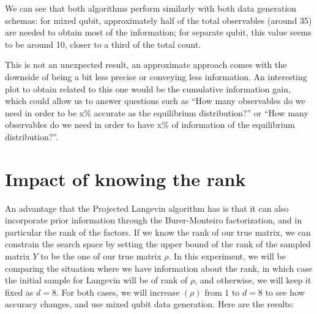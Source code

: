 \documentclass[12pt]{memoir}
\newcommand{\rhorank}[0]{\text{rank}$(\rho) $ }
\begin{document}
We can see that both algorithms perform similarly with both data generation schemas: for mixed qubit, approximately half of the total observables (around 35) are needed to obtain most of the information; for separate qubit, this value seems to be around 10, closer to a third of the total count.\medbreak


This is not an unexpected result, an approximate approach comes with the downside of being a bit less precise or conveying less information. An interesting plot to obtain related to this one would be the cumulative information gain, which could allow us to answer questions such as ``How many observables do we need in order to be x\% accurate as the equilibrium distribution?'' or ``How many observables do we need in order to have x\% of information of the equilibrium distribution?''.


\section{Impact of knowing the rank}\label{section:comp-rank-info}

An advantage that the Projected Langevin algorithm has is that it can also incorporate prior information through the Burer-Monteiro factorization, and in particular the rank of the factors. If we know the rank of our true matrix, we can constrain the search space by setting the upper bound of the rank of the sampled matrix $Y$ to be the one of our true matrix $\rho$. In this experiment, we will be comparing the situation where we have information about the rank, in which case the initial sample for Langevin will be of rank of $\rho$, and otherwise, we will keep it fixed as $d=8$. For both cases, we will increase \rhorank from $1$ to $d=8$ to see how accuracy changes, and use mixed qubit data generation. Here are the results:
\end{document}
